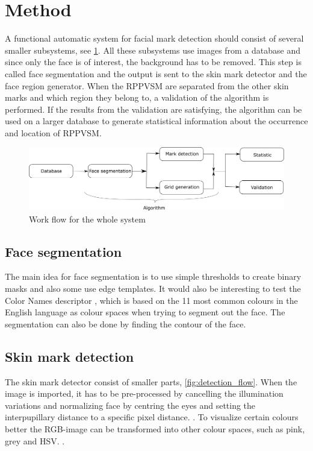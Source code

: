 \section{Method} \label{method}
A functional automatic system for facial mark detection should consist of several smaller subsystems, see \cref{fig:system_flow}. All these subsystems use images from a database and since only the face is of interest, the background has to be removed. This step is called face segmentation and the output is sent to the skin mark detector and the face region generator. When the RPPVSM are separated from the other skin marks and which region they belong to, a validation of the algorithm is performed. If the results from the validation are satisfying, the algorithm can be used on a larger database to generate statistical information about the occurrence and location of RPPVSM.  

\begin{figure}[H]
	\centering
	\includegraphics[width=1.0\linewidth]{"bilder/system_flow"}
	\caption{Work flow for the whole system}
	\label{fig:system_flow}
\end{figure}

\subsection{Face segmentation}

The main idea for face segmentation is to use simple thresholds to create binary masks and also some use edge templates. \cite{face_segmentation_skin} It would also be interesting to test the Color Names descriptor \cite{11_colours}, which is based on the 11 most common colours in the English language as colour spaces when trying to segment out the face. The segmentation can also be done by finding the contour of the face.  

\subsection{Skin mark detection}

The skin mark detector consist of smaller parts, \cref{fig:detection_flow}. When the image is imported, it has to be pre-processed by cancelling the illumination variations and normalizing face by centring the eyes and setting the interpupillary distance to a specific pixel distance. \cite{automatic_detector_2015}. To visualize certain colours better the RGB-image can be transformed into other colour spaces, such as pink, grey and HSV. \cite{11_colours}. 

